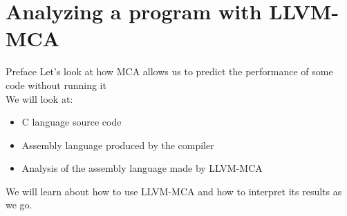 
\section{Analyzing a program with LLVM-MCA}


\begin{frame}{Preface}
Let's look at how MCA allows us to predict the performance of some code \alert{without running it}\\
\medskip
We will look at:
\begin{itemize}
\item C language source code
\item Assembly language produced by the compiler
\item Analysis of the assembly language made by LLVM-MCA
\end{itemize}
We will learn about how to use LLVM-MCA and how to interpret its results as we go.
\end{frame}










